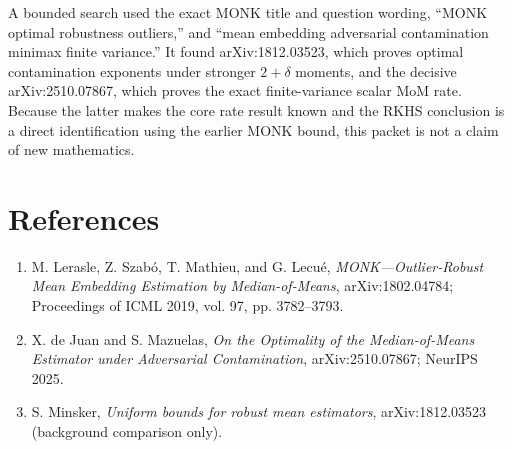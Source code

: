 \documentclass[11pt]{article}
\begin{document}
A bounded search used the exact MONK title and question wording, ``MONK
optimal robustness outliers,'' and ``mean embedding adversarial contamination
minimax finite variance.''  It found arXiv:1812.03523, which proves optimal
contamination exponents under stronger $2+\delta$ moments, and the decisive
arXiv:2510.07867, which proves the exact finite-variance scalar MoM rate.
Because the latter makes the core rate result known and the RKHS conclusion is
a direct identification using the earlier MONK bound, this packet is not a
claim of new mathematics.

\section*{References}

\begin{enumerate}
\item M. Lerasle, Z. Szab\'o, T. Mathieu, and G. Lecu\'e,
\emph{MONK---Outlier-Robust Mean Embedding Estimation by Median-of-Means},
arXiv:1802.04784; Proceedings of ICML 2019, vol. 97, pp. 3782--3793.
\item X. de Juan and S. Mazuelas,
\emph{On the Optimality of the Median-of-Means Estimator under Adversarial
Contamination}, arXiv:2510.07867; NeurIPS 2025.
\item S. Minsker, \emph{Uniform bounds for robust mean estimators},
arXiv:1812.03523 (background comparison only).
\end{enumerate}
\end{document}
